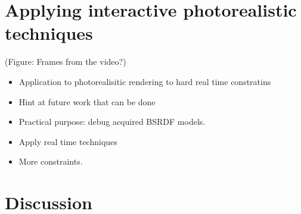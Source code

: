 \section{Applying interactive photorealistic techniques}
(Figure: Frames from the video?)

\begin{itemize}
\item Application to photorealisitic rendering to hard real time constratins
\item Hint at future work that can be done
\item Practical purpose: debug acquired BSRDF models.
\item Apply real time techniques
\item More constraints.
\end{itemize}

\section{Discussion}
